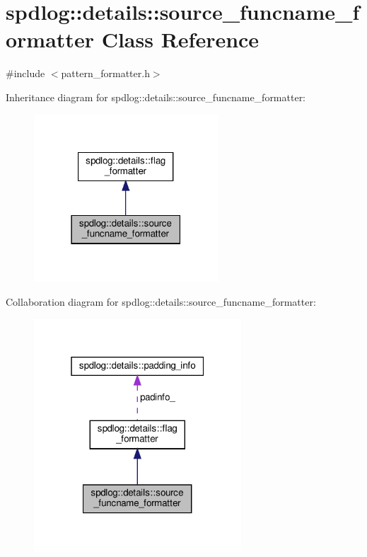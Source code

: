 \hypertarget{classspdlog_1_1details_1_1source__funcname__formatter}{}\section{spdlog\+:\+:details\+:\+:source\+\_\+funcname\+\_\+formatter Class Reference}
\label{classspdlog_1_1details_1_1source__funcname__formatter}


{\ttfamily \#include $<$pattern\+\_\+formatter.\+h$>$}



Inheritance diagram for spdlog\+:\+:details\+:\+:source\+\_\+funcname\+\_\+formatter\+:
\nopagebreak
\begin{figure}[H]
\begin{center}
\leavevmode
\includegraphics[width=195pt]{classspdlog_1_1details_1_1source__funcname__formatter__inherit__graph}
\end{center}
\end{figure}


Collaboration diagram for spdlog\+:\+:details\+:\+:source\+\_\+funcname\+\_\+formatter\+:
\nopagebreak
\begin{figure}[H]
\begin{center}
\leavevmode
\includegraphics[width=220pt]{classspdlog_1_1details_1_1source__funcname__formatter__coll__graph}
\end{center}
\end{figure}

